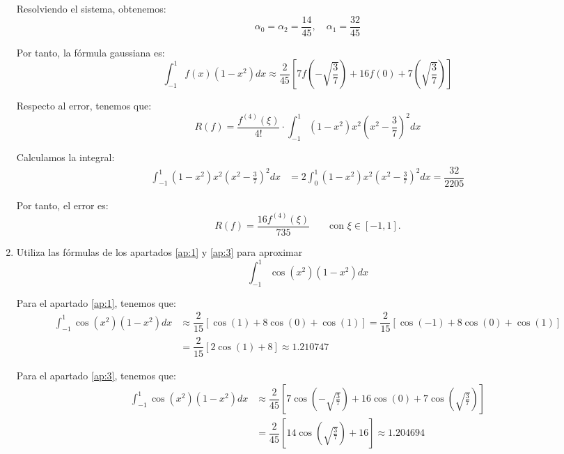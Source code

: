 \begin{ejercicio}
\begin{enumerate}
        Resolviendo el sistema, obtenemos:
        \begin{equation*}
            \alpha_0 = \alpha_2 = \dfrac{14}{45}, \quad \alpha_1 = \dfrac{32}{45}
        \end{equation*}

        Por tanto, la fórmula gaussiana es:
        \begin{equation*}
            \int_{-1}^{1} f(x)(1 - x^2)dx \approx \dfrac{2}{45}\left[7f\left(-\sqrt{\frac{3}{7}}\right) + 16f(0) + 7\left(\sqrt{\frac{3}{7}}\right)\right]
        \end{equation*}

        Respecto al error, tenemos que:
        \begin{equation*}
            R(f) = \dfrac{f^{(4)}(\xi)}{4!}\cdot \int_{-1}^{1} (1 - x^2)x^2\left(x^2 - \frac{3}{7}\right)^2dx
        \end{equation*}

        Calculamos la integral:
        \begin{align*}
            \int_{-1}^{1} (1 - x^2)x^2\left(x^2 - \frac{3}{7}\right)^2dx &=
            2\int_{0}^{1} (1 - x^2)x^2\left(x^2 - \frac{3}{7}\right)^2dx
            = \dfrac{32}{2205}
        \end{align*}

        Por tanto, el error es:
        \begin{equation*}
            R(f) = \dfrac{16f^{(4)}(\xi)}{735}\qquad \text{con } \xi\in [-1,1].
        \end{equation*}


        \item Utiliza las fórmulas de los apartados \ref{ap:1} y \ref{ap:3} para aproximar
        \begin{equation*}
            \int_{-1}^{1} \cos(x^2)(1 - x^2)dx
        \end{equation*}

        Para el apartado \ref{ap:1}, tenemos que:
        \begin{align*}
            \int_{-1}^{1} \cos(x^2)(1 - x^2)dx &\approx \dfrac{2}{15}\left[\cos(1) + 8\cos(0) + \cos(1)\right] = \dfrac{2}{15}\left[\cos(-1) + 8\cos(0) + \cos(1)\right]\\
            &= \dfrac{2}{15}\left[2\cos(1) + 8\right] \approx 1.210747
        \end{align*}

        Para el apartado \ref{ap:3}, tenemos que:
        \begin{align*}
            \int_{-1}^{1} \cos(x^2)(1 - x^2)dx &\approx \dfrac{2}{45}\left[7\cos\left(-\sqrt{\frac{3}{7}}\right) + 16\cos(0) + 7\cos\left(\sqrt{\frac{3}{7}}\right)\right]\\
            &= \dfrac{2}{45}\left[14\cos\left(\sqrt{\frac{3}{7}}\right) + 16\right] \approx 1.204694
        \end{align*}
    \end{enumerate}
\end{ejercicio}

